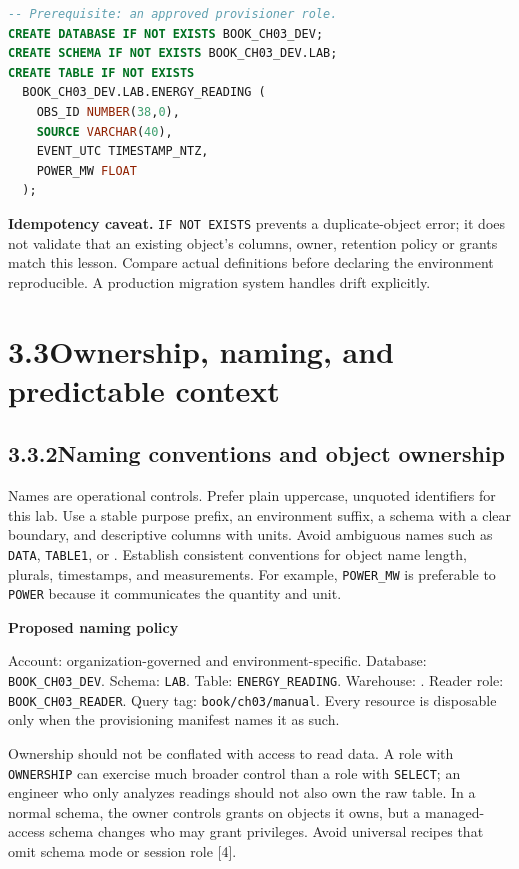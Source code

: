 \documentclass[11pt,twoside]{article}
\newcommand{\topic}[2]{\subsection*{#1\quad #2}}
\begin{document}
\begin{lstlisting}[language=SQL,caption={DDL excerpt for a dedicated training account. Administrator review required.}]
-- Prerequisite: an approved provisioner role.
CREATE DATABASE IF NOT EXISTS BOOK_CH03_DEV;
CREATE SCHEMA IF NOT EXISTS BOOK_CH03_DEV.LAB;
CREATE TABLE IF NOT EXISTS
  BOOK_CH03_DEV.LAB.ENERGY_READING (
    OBS_ID NUMBER(38,0),
    SOURCE VARCHAR(40),
    EVENT_UTC TIMESTAMP_NTZ,
    POWER_MW FLOAT
  );
\end{lstlisting}
\textbf{Idempotency caveat.} \texttt{IF NOT EXISTS} prevents a duplicate-object error; it does not validate that an existing object's columns, owner, retention policy or grants match this lesson. Compare actual definitions before declaring the environment reproducible. A production migration system handles drift explicitly.

\newpage
\section*{3.3\quad Ownership, naming, and predictable context}
\topic{3.3.2}{Naming conventions and object ownership}
Names are operational controls. Prefer plain uppercase, unquoted identifiers for this lab. Use a stable purpose prefix, an environment suffix, a schema with a clear boundary, and descriptive columns with units. Avoid ambiguous names such as \texttt{DATA}, \texttt{TABLE1}, or . Establish consistent conventions for object name length, plurals, timestamps, and measurements. For example, \texttt{POWER\_MW} is preferable to \texttt{POWER} because it communicates the quantity and unit.

\begin{whitebox}
\textbf{Proposed naming policy}\par
Account: organization-governed and environment-specific. Database: \texttt{BOOK\_CH03\_DEV}. Schema: \texttt{LAB}. Table: \texttt{ENERGY\_READING}. Warehouse: . Reader role: \texttt{BOOK\_CH03\_READER}. Query tag: \texttt{book/ch03/manual}. Every resource is disposable only when the provisioning manifest names it as such.
\end{whitebox}
Ownership should not be conflated with access to read data. A role with \texttt{OWNERSHIP} can exercise much broader control than a role with \texttt{SELECT}; an engineer who only analyzes readings should not also own the raw table. In a normal schema, the owner controls grants on objects it owns, but a managed-access schema changes who may grant privileges. Avoid universal recipes that omit schema mode or session role [4].
\end{document}
